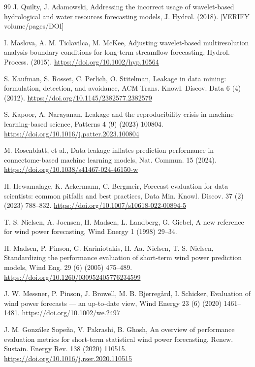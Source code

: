 \documentclass[review,3p,times]{elsarticle}
\begin{document}
\begin{thebibliography}{99}
J. Quilty, J. Adamowski,
Addressing the incorrect usage of wavelet-based hydrological and water
resources forecasting models,
J. Hydrol. (2018). \textsf{[VERIFY volume/pages/DOI]}

I. Maslova, A. M. Ticlavilca, M. McKee,
Adjusting wavelet-based multiresolution analysis boundary conditions for
long-term streamflow forecasting,
Hydrol. Process. (2015).
\url{https://doi.org/10.1002/hyp.10564}

S. Kaufman, S. Rosset, C. Perlich, O. Stitelman,
Leakage in data mining: formulation, detection, and avoidance,
ACM Trans. Knowl. Discov. Data 6 (4) (2012).
\url{https://doi.org/10.1145/2382577.2382579}

S. Kapoor, A. Narayanan,
Leakage and the reproducibility crisis in machine-learning-based science,
Patterns 4 (9) (2023) 100804.
\url{https://doi.org/10.1016/j.patter.2023.100804}

M. Rosenblatt, et al.,
Data leakage inflates prediction performance in connectome-based machine
learning models,
Nat. Commun. 15 (2024).
\url{https://doi.org/10.1038/s41467-024-46150-w}

H. Hewamalage, K. Ackermann, C. Bergmeir,
Forecast evaluation for data scientists: common pitfalls and best practices,
Data Min. Knowl. Discov. 37 (2) (2023) 788--832.
\url{https://doi.org/10.1007/s10618-022-00894-5}

T. S. Nielsen, A. Joensen, H. Madsen, L. Landberg, G. Giebel,
A new reference for wind power forecasting,
Wind Energy 1 (1998) 29--34.

H. Madsen, P. Pinson, G. Kariniotakis, H. Aa. Nielsen, T. S. Nielsen,
Standardizing the performance evaluation of short-term wind power prediction
models,
Wind Eng. 29 (6) (2005) 475--489.
\url{https://doi.org/10.1260/030952405776234599}

J. W. Messner, P. Pinson, J. Browell, M. B. Bjerregård, I. Schicker,
Evaluation of wind power forecasts --- an up-to-date view,
Wind Energy 23 (6) (2020) 1461--1481.
\url{https://doi.org/10.1002/we.2497}

J. M. González Sopeña, V. Pakrashi, B. Ghosh,
An overview of performance evaluation metrics for short-term statistical wind
power forecasting,
Renew. Sustain. Energy Rev. 138 (2020) 110515.
\url{https://doi.org/10.1016/j.rser.2020.110515}


\end{thebibliography}
\end{document}
